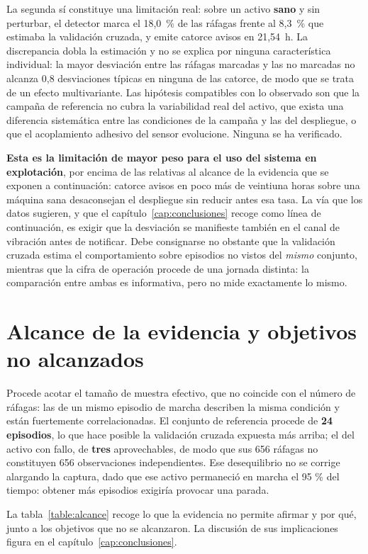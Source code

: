 La segunda sí constituye una limitación real: sobre un activo \textbf{sano} y sin perturbar, el
detector marca el \mbox{18,0 \%} de las ráfagas frente al \mbox{8,3 \%} que estimaba la
validación cruzada, y emite catorce avisos en \mbox{21,54 h}. La discrepancia dobla la
estimación y no se explica por ninguna característica individual: la mayor desviación entre las
ráfagas marcadas y las no marcadas no alcanza \mbox{0,8} desviaciones típicas en ninguna de las
catorce, de modo que se trata de un efecto multivariante. Las hipótesis compatibles con lo
observado son que la campaña de referencia no cubra la variabilidad real del activo, que exista
una diferencia sistemática entre las condiciones de la campaña y las del despliegue, o que el
acoplamiento adhesivo del sensor evolucione. Ninguna se ha verificado.

\textbf{Esta es la limitación de mayor peso para el uso del sistema en explotación}, por encima
de las relativas al alcance de la evidencia que se exponen a continuación: catorce avisos en poco
más de veintiuna horas sobre una máquina sana desaconsejan el despliegue sin reducir antes esa
tasa. La vía que los datos sugieren, y que el capítulo~\ref{cap:conclusiones} recoge como línea
de continuación, es exigir que la desviación se manifieste también en el canal de vibración antes
de notificar. Debe consignarse no obstante que la validación cruzada estima el comportamiento sobre
episodios no vistos del \textit{mismo} conjunto, mientras que la cifra de operación procede de
una jornada distinta: la comparación entre ambas es informativa, pero no mide exactamente lo
mismo.

\section{Alcance de la evidencia y objetivos no alcanzados}

Procede acotar el tamaño de muestra efectivo, que no coincide con el número de ráfagas: las de un
mismo episodio de marcha describen la misma condición y están fuertemente correlacionadas. El
conjunto de referencia procede de \textbf{24 episodios}, lo que hace posible la validación cruzada
expuesta más arriba; el del activo con fallo, de \textbf{tres} aprovechables, de modo que sus 656
ráfagas no constituyen 656 observaciones independientes. Ese desequilibrio no se corrige alargando
la captura, dado que ese activo permaneció en marcha el 95 \% del tiempo: obtener más episodios
exigiría provocar una parada.

La tabla~\ref{table:alcance} recoge lo que la evidencia no permite afirmar y por qué, junto a los
objetivos que no se alcanzaron. La discusión de sus implicaciones figura en el
capítulo~\ref{cap:conclusiones}.

